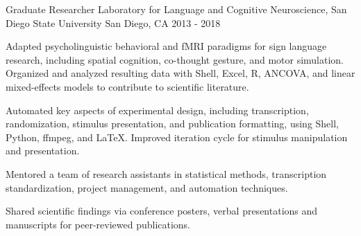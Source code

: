 \begin{cventries}
    {Graduate Researcher}
    {Laboratory for Language and Cognitive Neuroscience, San Diego State University}
    {San Diego, CA}
    {2013 - 2018}
    {
      \begin{cvitems}
        \item {Adapted psycholinguistic behavioral and fMRI paradigms for sign language research, including spatial cognition, co-thought gesture, and motor simulation. Organized and analyzed resulting data with Shell, Excel, R, ANCOVA, and linear mixed-effects models to contribute to scientific literature.}
        \item {Automated key aspects of experimental design, including transcription, randomization, stimulus presentation, and publication formatting, using Shell, Python, ffmpeg, and \LaTeX. Improved iteration cycle for stimulus manipulation and presentation.}
        \item {Mentored a team of research assistants in statistical methods, transcription standardization, project management, and automation techniques.}
        \item {Shared scientific findings via conference posters, verbal presentations and manuscripts for peer-reviewed publications.}
      \end{cvitems}
    }

\end{cventries}
